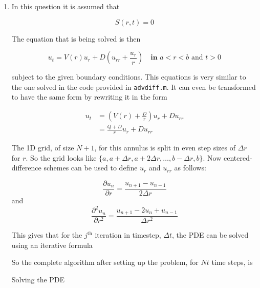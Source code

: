 \documentclass{article}
\begin{document}
\begin{enumerate}
	\item In this question it is assumed that 
	
	\[
		S(r,t) = 0
	\]
	
	The equation that is being solved is then
	
	\begin{equation}
		u_t = V(r) u_r + D(u_{rr} + \frac{u_r}{r}) \quad \textbf{in } a < r < b \text{ and } t>0
	\end{equation}
	
	subject to the given boundary conditions. This equations is very similar to the one solved in the code provided in \texttt{advdiff.m}. It can even be transformed to have the same form by rewriting it in the form
	
	\begin{equation}
		\begin{split}
			u_t 
			& = ( V(r) + \frac{D}{r}) u_r + D u_{rr} \\
			& = \frac{Q + D}{r} u_r + D u_{rr}
		\end{split}
	\end{equation}
	
	The 1D grid, of size $N+1$, for this annulus is split in even step sizes of $\Delta r$ for $r$. So the grid looks like $\{a, a +  \Delta r, a + 2 \Delta r, \dots, b - \Delta r, b\}$. Now centered-difference schemes can be used to define $u_{r}$ and $u_{rr}$ as follows:
	
	\begin{equation}
		\frac{\partial u_{n}}{\partial r} =  \frac{ u_{n+1} - u_{n-1} }{ 2\Delta r}
	\end{equation}
	and
	\begin{equation}
		\frac{\partial^2 u_{n}}{\partial r^2} =  \frac{ u_{n+1} -2u_{n} + u_{n-1} }{ \Delta r^2}
	\end{equation}
	
	This gives that for the $j^\text{th}$ iteration in timestep, $\Delta t$, the PDE can be solved using an iterative formula
	
	
	So the complete algorithm after setting up the problem, for $Nt$ time steps, is
	
	\begin{algorithm}[H]	
		\SetAlgoLined
		\caption{Solving the PDE}	
	\end{algorithm}


\end{enumerate}
\end{document}

